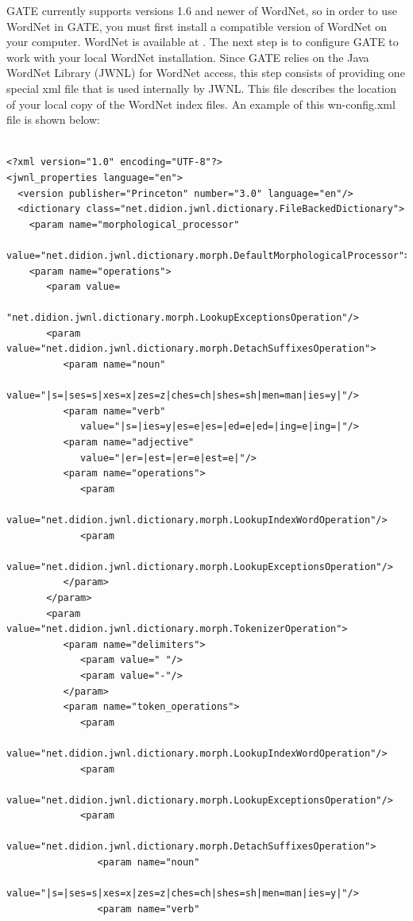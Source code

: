 %
GATE currently supports versions 1.6 and newer of WordNet, so in order to use
WordNet in GATE, you must first install a compatible version of WordNet on your
computer. WordNet is available at
. The next step is to
configure GATE to work with your local WordNet installation. Since
GATE relies on the Java WordNet Library (JWNL) for WordNet access,
this step consists of providing one special xml file that is used
internally by JWNL. This file describes the location of your local
copy of the WordNet index files. An example of this wn-config.xml
file is shown below:

\begin{small}
\begin{verbatim}

<?xml version="1.0" encoding="UTF-8"?>
<jwnl_properties language="en">
  <version publisher="Princeton" number="3.0" language="en"/>
  <dictionary class="net.didion.jwnl.dictionary.FileBackedDictionary">
    <param name="morphological_processor"
       value="net.didion.jwnl.dictionary.morph.DefaultMorphologicalProcessor">
    <param name="operations">
       <param value=
          "net.didion.jwnl.dictionary.morph.LookupExceptionsOperation"/>
       <param value="net.didion.jwnl.dictionary.morph.DetachSuffixesOperation">
          <param name="noun" 
             value="|s=|ses=s|xes=x|zes=z|ches=ch|shes=sh|men=man|ies=y|"/>
          <param name="verb" 
             value="|s=|ies=y|es=e|es=|ed=e|ed=|ing=e|ing=|"/>
          <param name="adjective" 
             value="|er=|est=|er=e|est=e|"/>
          <param name="operations">
             <param 
                value="net.didion.jwnl.dictionary.morph.LookupIndexWordOperation"/>
             <param 
                value="net.didion.jwnl.dictionary.morph.LookupExceptionsOperation"/>
          </param>
       </param>
       <param value="net.didion.jwnl.dictionary.morph.TokenizerOperation">
          <param name="delimiters">
             <param value=" "/>
             <param value="-"/>
          </param>
          <param name="token_operations">
             <param 
                value="net.didion.jwnl.dictionary.morph.LookupIndexWordOperation"/>
             <param 
                value="net.didion.jwnl.dictionary.morph.LookupExceptionsOperation"/>
             <param 
                value="net.didion.jwnl.dictionary.morph.DetachSuffixesOperation">
                <param name="noun" 
                   value="|s=|ses=s|xes=x|zes=z|ches=ch|shes=sh|men=man|ies=y|"/>
                <param name="verb" 

\end{verbatim}
\end{small}
